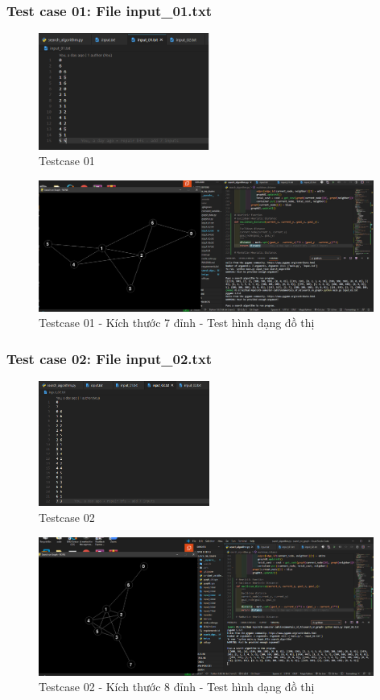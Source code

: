 \documentclass{article}
\begin{document}
\subsubsection{Test case 01: File input\_01.txt}
\begin{figure}[H]
\centering
\includegraphics[width=0.5\textwidth]{Test_Case_01_Content.png}
\caption{Testcase 01}
\end{figure}
\begin{figure}[H]
\centering
\includegraphics[width=0.98\textwidth]{Test_Case_01.png}
\caption{Testcase 01 - Kích thước 7 đỉnh - Test hình dạng đồ thị}
\end{figure}
\subsubsection{Test case 02: File input\_02.txt}
\begin{figure}[H]
\centering
\includegraphics[width=0.5\textwidth]{Test_Case_02_Content.png}
\caption{Testcase 02}
\end{figure}
\begin{figure}[H]
\centering
\includegraphics[width=0.98\textwidth]{Test_Case_02.png}
\caption{Testcase 02 - Kích thước 8 đỉnh - Test hình dạng đồ thị}
\end{figure}
\end{document}
